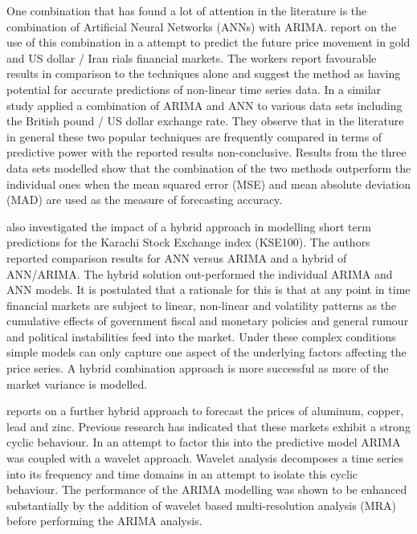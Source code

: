 One combination that has found a lot of attention in the literature is the combination of Artificial Neural Networks (ANNs) with ARIMA. \cite{Khashei2009956} report on the use of this combination in a attempt to predict the future price movement in gold and US dollar / Iran rials financial markets. The workers report favourable results in comparison to the techniques alone and suggest the method as having potential for accurate predictions of non-linear time series data. In a similar study \cite{Zhang2003159} applied a combination of ARIMA and ANN to various data sets including the British pound / US dollar exchange rate. They observe that in the literature in general these two popular techniques are frequently compared in terms of predictive power with the reported results non-conclusive. Results from the three data sets modelled show that the combination of the two methods outperform the individual ones when the mean squared error (MSE) and mean
absolute deviation (MAD) are used as the measure of forecasting accuracy.

\cite{Fatima20082742} also investigated the impact of a hybrid approach in modelling short term predictions for the Karachi Stock Exchange index (KSE100). The authors reported comparison results for ANN versus ARIMA and a hybrid of ANN/ARIMA. The hybrid solution out-performed the individual ARIMA and ANN models. It is postulated that a rationale for this is that at any point in time financial markets are subject to linear, non-linear and volatility patterns as the cumulative effects of government fiscal and monetary policies and general rumour and political instabilities feed into the market. Under these complex conditions simple models can only capture one aspect of the underlying factors affecting the price series. A hybrid combination approach is more successful as more of the market variance is modelled.

\cite{Kriechbaumer201432} reports on a further hybrid approach to forecast the prices of aluminum, copper, lead and zinc. Previous research has indicated that these markets exhibit a strong cyclic behaviour. In an attempt to factor this into the predictive model ARIMA was coupled with a wavelet approach. Wavelet analysis decomposes a time series into its frequency and time domains in an attempt to isolate this cyclic behaviour. The performance of the ARIMA modelling was shown to be enhanced substantially by the addition of wavelet based multi-resolution analysis (MRA) before performing the ARIMA analysis.

